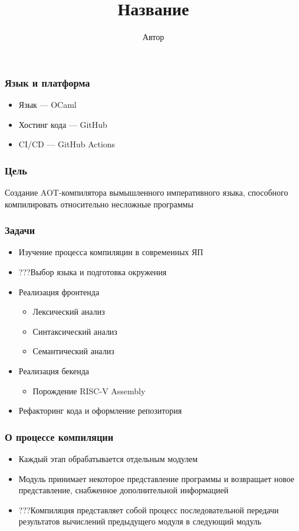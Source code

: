 \documentclass{beamer}
\title{Название}
\author{Автор}
\begin{document}
	
	\begin{frame}[plain]
		\maketitle
	\end{frame}
	
	\begin{frame}
	\frametitle{Язык и платформа}
	\begin{itemize}
			\item Язык — OCaml
			\item Хостинг кода — GitHub
			\item CI/CD — GitHub Actions
		\end{itemize}
	\end{frame}
	
	\begin{frame}
		\frametitle{Цель}
		Создание AOT-компилятора вымышленного императивного языка, способного компилировать относительно несложные программы 
	\end{frame}
	
	\begin{frame}
		\frametitle{Задачи}
		
		\begin{itemize}
			\item Изучение процесса компиляции в современных ЯП
			\item ???Выбор языка и подготовка окружения
			\item Реализация фронтенда
			\begin{itemize}
				\item Лексический анализ
				\item Синтаксический анализ
				\item Семантический анализ
			\end{itemize}
			\item Реализация бекенда
			\begin{itemize}
				\item Порождение RISC-V Assembly
			\end{itemize}
			\item Рефакторинг кода и оформление репозитория
		\end{itemize}
	\end{frame}
	
	\begin{frame}
		\frametitle{О процессе компиляции}
		
			\begin{itemize}
			\item Каждый этап обрабатывается отдельным модулем
			\item Модуль принимает некоторое представление программы и возвращает новое представление, снабженное дополнительной информацией
			\item ???Компиляция представляет собой процесс последовательной передачи результатов вычислений предыдущего модуля в следующий модуль
			\end{itemize}

	\end{frame}
	
\end{document}
